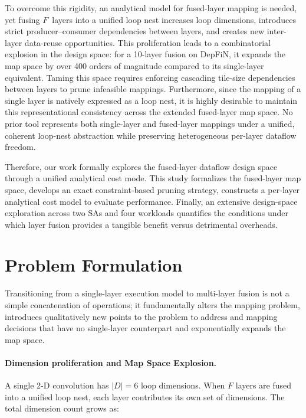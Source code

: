 \documentclass[11pt,a4paper,twocolumn]{article}
\begin{document}
To overcome this rigidity, an analytical model for
fused-layer mapping is needed, yet fusing $F$~layers into a unified loop nest increases loop dimensions, introduces strict producer--consumer dependencies between layers, and creates new inter-layer data-reuse opportunities. This proliferation leads to a combinatorial explosion in the design space: for a 10-layer fusion on DepFiN, it expands the map space by over 400 orders of magnitude compared to its single-layer equivalent.
Taming this space requires enforcing cascading
tile-size dependencies between layers to prune infeasible mappings.
Furthermore, since the mapping of a single layer is natively expressed
as a loop nest, it is highly desirable to maintain this
representational consistency across the extended fused-layer map
space. No prior tool represents both single-layer and fused-layer mappings
under a unified, coherent loop-nest abstraction while preserving
heterogeneous per-layer dataflow freedom.

Therefore, our work formally explores the fused-layer dataflow design space through a unified analytical cost mode.
This study formalizes the fused-layer map space,
develops an exact constraint-based pruning strategy,
constructs a per-layer analytical cost model to evaluate performance.
Finally, an extensive design-space exploration across two SAs and four workloads
quantifies the conditions under which layer fusion provides a tangible benefit versus detrimental
overheads.


\section*{Problem Formulation}
Transitioning from a single-layer execution model to multi-layer fusion is not a simple concatenation of operations; it fundamentally alters the mapping problem, introduces qualitatively new
points to the problem to address and mapping decisions that have no single-layer counterpart and exponentially expands the map space.


\paragraph{Dimension proliferation and Map Space Explosion.}
A single 2-D convolution has $|D| = 6$ loop dimensions.
When $F$ layers are fused into a unified loop nest,
each layer contributes its own set of dimensions.
The total dimension count grows as:
\end{document}
